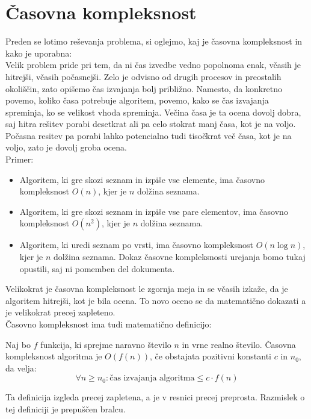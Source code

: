\section{Časovna kompleksnost}\label{sec:casovna-kompleksnost}
Preden se lotimo reševanja problema, si oglejmo, kaj je časovna kompleksnost in kako je uporabna:\\
Velik problem pride pri tem, da ni čas izvedbe vedno popolnoma enak, včasih je hitrejši, včasih počasnejši.
Zelo je odvisno od drugih procesov in preostalih okoliščin, zato opišemo čas izvajanja bolj približno.
Namesto, da konkretno povemo, koliko časa potrebuje algoritem, povemo, kako se čas izvajanja spreminja, ko se velikost vhoda spreminja.
Večina časa je ta ocena dovolj dobra, saj hitra rešitev porabi desetkrat ali pa celo stokrat manj časa, kot je na voljo.
Počasna resitev pa porabi lahko potencialno tudi tisočkrat več časa, kot je na voljo, zato je dovolj groba ocena.\\
Primer:
\begin{itemize}
    \item Algoritem, ki gre skozi seznam in izpiše vse elemente, ima časovno kompleksnost $O(n)$, kjer je $n$ dolžina seznama.
    \item Algoritem, ki gre skozi seznam in izpiše vse pare elementov, ima časovno kompleksnost $O(n^2)$, kjer je $n$ dolžina seznama.
    \item Algoritem, ki uredi seznam po vrsti, ima časovno kompleksnost $O(n\log n)$, kjer je $n$ dolžina seznama.
    Dokaz časovne kompleksnosti urejanja bomo tukaj opustili, saj ni pomemben del dokumenta.
\end{itemize}
Velikokrat je časovna kompleksnost le zgornja meja in se včasih izkaže, da je algoritem hitrejši, kot je bila ocena.
To novo oceno se da matematično dokazati a je velikokrat precej zapleteno.\\
Časovno kompleksnost ima tudi matematično definicijo:
\begin{definition}
    Naj bo $f$ funkcija, ki sprejme naravno število $n$ in vrne realno število.
    Časovna kompleksnost algoritma je $O(f(n))$, če obstajata pozitivni konstanti $c$ in $n_0$, da velja:
    \begin{equation*}
        \forall n \geq n_0: \text{čas izvajanja algoritma} \leq c \cdot f(n)
    \end{equation*}
\end{definition}
Ta definicija izgleda precej zapletena, a je v resnici precej preprosta.
Razmislek o tej definiciji je prepuščen bralcu.\\
